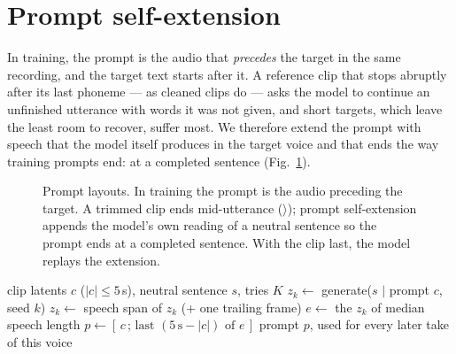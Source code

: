 \documentclass[conference]{IEEEtran}
\begin{document}
\section{Prompt self-extension}\label{sec:b}
In training, the prompt is the audio that \emph{precedes} the target in the same recording, and the target
text starts after it. A reference clip that stops abruptly after its last phoneme --- as cleaned clips do ---
asks the model to continue an unfinished utterance with words it was not given, and short targets, which
leave the least room to recover, suffer most. We therefore extend the prompt with speech that the model
itself produces in the target voice and that ends the way training prompts end: at a completed sentence
(Fig.~\ref{fig:layout}).

\begin{figure}[t]
\centering
{}
\caption{Prompt layouts. In training the prompt is the audio preceding the target. A trimmed clip ends
mid-utterance ($\rangle$); prompt self-extension appends the model's own reading of a neutral sentence so
the prompt ends at a completed sentence. With the clip last, the model replays the extension.}
\label{fig:layout}
\end{figure}

\begin{algorithm}[t]
\caption{Prompt self-extension (once per voice)}\label{alg:ext}
\begin{algorithmic}[1]
\REQUIRE clip latents $c$ ($|c|\le 5$\,s), neutral sentence $s$, tries $K$
  \STATE $z_k \gets$ generate($s$ $\mid$ prompt $c$, seed $k$)
  \STATE $z_k \gets$ speech span of $z_k$ (+ one trailing frame)
\ENDFOR
\STATE $e \gets$ the $z_k$ of median speech length 
\STATE $p \gets [\,c \,;\, \text{last } (5\,\text{s} - |c|) \text{ of } e\,]$ 
\ENSURE prompt $p$, used for every later take of this voice
\end{algorithmic}
\end{algorithm}
\end{document}
